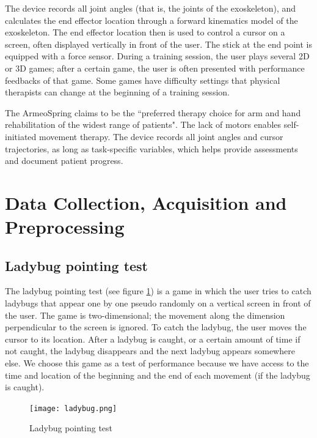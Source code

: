 The device records all joint angles (that is, the joints of the exoskeleton), and calculates the end effector location through a forward kinematics model of the exoskeleton. 
The end effector location then is used to control a cursor on a screen, often displayed vertically in front of the user. 
The stick at the end point is equipped with a force sensor. 
During a training session, the user plays several 2D or 3D games; after a certain game, the user is often presented with performance feedbacks of that game.
Some games have difficulty settings that physical therapists can change at the beginning of a training session.

The ArmeoSpring claims to be the ``preferred therapy choice for arm and hand rehabilitation of the widest range of patients"\footnotemark[\ref{aowebsite}]. 
The lack of motors enables self-initiated movement therapy. 
The device records all joint angles and cursor trajectories, as long as task-specific variables, which helps provide assessments and document patient progress.

\section{Data Collection, Acquisition and Preprocessing}
\label{datacollect}

\subsection{Ladybug pointing test}

The ladybug pointing test (see figure \ref{fig:ladybug}) is a game in which the user tries to catch ladybugs that appear one by one pseudo randomly on a vertical screen in front of the user. 
The game is two-dimensional; the movement along the dimension perpendicular to the screen is ignored. 
To catch the ladybug, the user moves the cursor to its location. After a ladybug is caught, or a certain amount of time if not caught, the ladybug disappears and the next ladybug appears somewhere else. 
We choose this game as a test of performance because we have access to the time and location of the beginning and the end of each movement (if the ladybug is caught).%

\begin{figure}
	\texttt{[image: ladybug.png]}
	\centering
	\caption{Ladybug pointing test}
	\label{fig:ladybug}
\end{figure}


